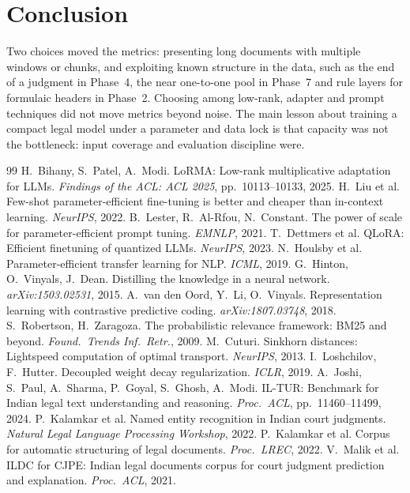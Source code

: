 \documentclass[10pt,a4paper]{article}
\begin{document}
\section{Conclusion}
Two choices moved the metrics: presenting long documents with multiple windows or chunks, and exploiting known structure in the data, such as the end of a judgment in Phase~4, the near one-to-one pool in Phase~7 and rule layers for formulaic headers in Phase~2. Choosing among low-rank, adapter and prompt techniques did not move metrics beyond noise. The main lesson about training a compact legal model under a parameter and data lock is that capacity was not the bottleneck: input coverage and evaluation discipline were.

\begin{thebibliography}{99}\small
{} H.~Bihany, S.~Patel, A.~Modi. LoRMA: Low-rank multiplicative adaptation for LLMs. \emph{Findings of the ACL: ACL 2025}, pp.~10113--10133, 2025.
 H.~Liu et al. Few-shot parameter-efficient fine-tuning is better and cheaper than in-context learning. \emph{NeurIPS}, 2022.
 B.~Lester, R.~Al-Rfou, N.~Constant. The power of scale for parameter-efficient prompt tuning. \emph{EMNLP}, 2021.
 T.~Dettmers et al. QLoRA: Efficient finetuning of quantized LLMs. \emph{NeurIPS}, 2023.
 N.~Houlsby et al. Parameter-efficient transfer learning for NLP. \emph{ICML}, 2019.
 G.~Hinton, O.~Vinyals, J.~Dean. Distilling the knowledge in a neural network. \emph{arXiv:1503.02531}, 2015.
 A.~van den Oord, Y.~Li, O.~Vinyals. Representation learning with contrastive predictive coding. \emph{arXiv:1807.03748}, 2018.
 S.~Robertson, H.~Zaragoza. The probabilistic relevance framework: BM25 and beyond. \emph{Found.\ Trends Inf.\ Retr.}, 2009.
 M.~Cuturi. Sinkhorn distances: Lightspeed computation of optimal transport. \emph{NeurIPS}, 2013.
 I.~Loshchilov, F.~Hutter. Decoupled weight decay regularization. \emph{ICLR}, 2019.
 A.~Joshi, S.~Paul, A.~Sharma, P.~Goyal, S.~Ghosh, A.~Modi. IL-TUR: Benchmark for Indian legal text understanding and reasoning. \emph{Proc.\ ACL}, pp.~11460--11499, 2024.
 P.~Kalamkar et al. Named entity recognition in Indian court judgments. \emph{Natural Legal Language Processing Workshop}, 2022.
 P.~Kalamkar et al. Corpus for automatic structuring of legal documents. \emph{Proc.\ LREC}, 2022.
 V.~Malik et al. ILDC for CJPE: Indian legal documents corpus for court judgment prediction and explanation. \emph{Proc.\ ACL}, 2021.

\end{thebibliography}
\end{document}
